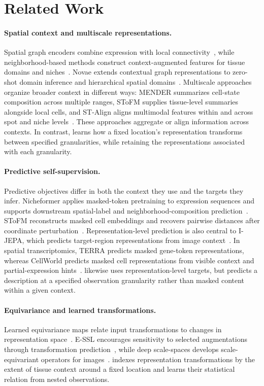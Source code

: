 
\section{Related Work}

\paragraph{Spatial context and multiscale representations.}
Spatial graph encoders combine expression with local connectivity~\citep{dong2022stagate,long2023graphst}, while neighborhood-based methods construct context-augmented features for tissue domains and niches~\citep{singhal2024banksy,varrone2024cellcharter}. Novae extends contextual graph representations to zero-shot domain inference and hierarchical spatial domains~\citep{blampey2025novae}. Multiscale approaches organize broader context in different ways: MENDER summarizes cell-state composition across multiple ranges, SToFM supplies tissue-level summaries alongside local cells, and ST-Align aligns multimodal features within and across spot and niche levels~\citep{yuan2024mender,zhao2025stofm,lin2024stalign}. These approaches aggregate or align information across contexts. In contrast, \method{} learns how a fixed location's representation transforms between specified granularities, while retaining the representations associated with each granularity.

\paragraph{Predictive self-supervision.}
Predictive objectives differ in both the context they use and the targets they infer. Nicheformer applies masked-token pretraining to expression sequences and supports downstream spatial-label and neighborhood-composition prediction~\citep{tejada2025nicheformer}. SToFM reconstructs masked cell embeddings and recovers pairwise distances after coordinate perturbation~\citep{zhao2025stofm}. Representation-level prediction is also central to I-JEPA, which predicts target-region representations from image context~\citep{assran2023ijepa}. In spatial transcriptomics, TERRA predicts masked gene-token representations, whereas CellWorld predicts masked cell representations from visible context and partial-expression hints~\citep{birk2026terra,liu2026cellworld}. \method{} likewise uses representation-level targets, but predicts a description at a specified observation granularity rather than masked content within a given context.

\paragraph{Equivariance and learned transformations.}
Learned equivariance maps relate input transformations to changes in representation space~\citep{lenc2015equivariance}. E-SSL encourages sensitivity to selected augmentations through transformation prediction~\citep{dangovski2022equivariant}, while deep scale-spaces develops scale-equivariant operators for images~\citep{worrall2019deep}. \method{} indexes representation transformations by the extent of tissue context around a fixed location and learns their statistical relation from nested observations.
